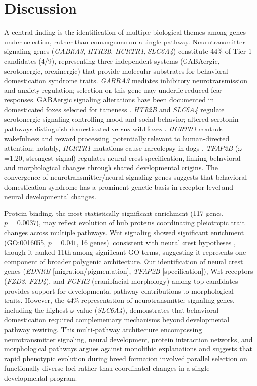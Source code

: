 \documentclass[11pt,letterpaper]{article}
\begin{document}
\section{Discussion}

A central finding is the identification of multiple biological themes among genes under selection, rather than convergence on a single pathway. Neurotransmitter signaling genes (\textit{GABRA3}, \textit{HTR2B}, \textit{HCRTR1}, \textit{SLC6A4}) constitute 44\% of Tier 1 candidates (4/9), representing three independent systems (GABAergic, serotonergic, orexinergic) that provide molecular substrates for behavioral domestication syndrome traits. \textit{GABRA3} mediates inhibitory neurotransmission and anxiety regulation; selection on this gene may underlie reduced fear responses. GABAergic signaling alterations have been documented in domesticated foxes selected for tameness \citep{Trut2009}. \textit{HTR2B} and \textit{SLC6A4} regulate serotonergic signaling controlling mood and social behavior; altered serotonin pathways distinguish domesticated versus wild foxes \citep{Kukekova2018}. \textit{HCRTR1} controls wakefulness and reward processing, potentially relevant to human-directed attention; notably, \textit{HCRTR1} mutations cause narcolepsy in dogs \citep{Lin1999}. \textit{TFAP2B} ($\omega$=1.20, strongest signal) regulates neural crest specification, linking behavioral and morphological changes through shared developmental origins. The convergence of neurotransmitter/neural signaling genes suggests that behavioral domestication syndrome has a prominent genetic basis in receptor-level and neural developmental changes.

Protein binding, the most statistically significant enrichment (117 genes, $p=0.0037$), may reflect evolution of hub proteins coordinating pleiotropic trait changes across multiple pathways. Wnt signaling showed significant enrichment (GO:0016055, $p=0.041$, 16 genes), consistent with neural crest hypotheses \citep{Wilkins2014}, though it ranked 11th among significant GO terms, suggesting it represents one component of broader polygenic architecture. Our identification of neural crest genes (\textit{EDNRB} [migration/pigmentation], \textit{TFAP2B} [specification]), Wnt receptors (\textit{FZD3}, \textit{FZD4}), and \textit{FGFR2} (craniofacial morphology) among top candidates provides support for developmental pathway contributions to morphological traits. However, the 44\% representation of neurotransmitter signaling genes, including the highest $\omega$ value (\textit{SLC6A4}), demonstrates that behavioral domestication required complementary mechanisms beyond developmental pathway rewiring. This multi-pathway architecture encompassing neurotransmitter signaling, neural development, protein interaction networks, and morphological pathways argues against monolithic explanations and suggests that rapid phenotypic evolution during breed formation involved parallel selection on functionally diverse loci rather than coordinated changes in a single developmental program.
\end{document}
